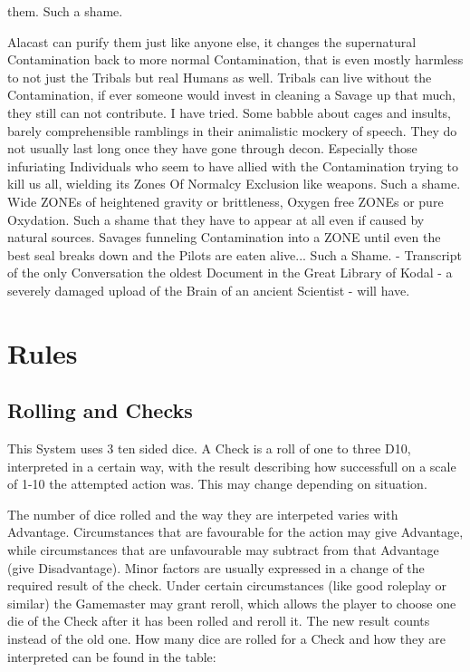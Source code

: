 \documentclass{article}
\begin{document}
    them. Such a shame. \par
    Alacast can purify them just like anyone else, it changes the supernatural Contamination back to more normal
    Contamination, that is even mostly harmless to not just the Tribals but real Humans as well. Tribals can live without
    the Contamination, if ever someone would invest in cleaning a Savage up that much, they still can not contribute.
    I have tried. Some babble about cages and insults, barely comprehensible ramblings in their animalistic mockery of
    speech. They do not usually last long once they have gone through decon. Especially those infuriating Individuals
    who seem to have allied with the Contamination trying to kill us all, wielding its Zones Of Normalcy Exclusion like
    weapons. Such a shame. Wide ZONEs of heightened gravity or brittleness, Oxygen free ZONEs or pure Oxydation. Such a
    shame that they have to appear at all even if caused by natural sources. Savages funneling Contamination into a ZONE
    until even the best seal breaks down and the Pilots are eaten alive... Such a Shame.\newline
    \newline
    - Transcript of the only Conversation the oldest Document in the Great Library of Kodal - a severely damaged
    upload of the Brain of an ancient Scientist - will have.\newpage

    \section{Rules}
    \subsection{Rolling and Checks}

    This System uses 3 ten sided dice. A Check is a roll of one to three D10, interpreted
    in a certain way, with the result describing how successfull on a scale of 1-10 the attempted action was.
    This may change depending on situation. \par
    The number of dice rolled and the way they are interpeted varies with Advantage.
    Circumstances that are favourable for the action may give Advantage, while circumstances
    that are unfavourable may subtract from that Advantage (give Disadvantage).
    Minor factors are usually expressed in a change of the required result of the check. Under certain circumstances (like
    good roleplay or similar) the Gamemaster may grant reroll, which allows the player to choose one die of the Check after
    it has been rolled and reroll it. The new result counts instead of the old one. \newline\newline
    How many dice are rolled for a Check and how they are interpreted can be found in the table:\par
\end{document}
